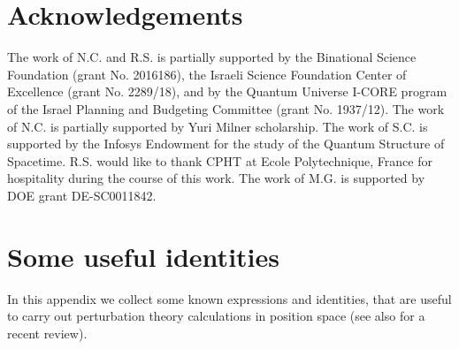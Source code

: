 \documentclass[aps,amsmath,amssymb,prd,showpacs,floatfix,preprint,superscriptaddress,nofootinbib,12pt]{article}
\begin{document}
\section*{Acknowledgements} \noindent  
The work of N.C. and R.S. is partially supported by the Binational Science Foundation (grant No. 2016186), the Israeli Science Foundation Center of Excellence (grant No. 2289/18), and by the Quantum Universe I-CORE program of the Israel Planning and Budgeting Committee (grant No. 1937/12). The work of N.C. is partially supported by Yuri Milner scholarship.
The work of S.C. is supported by the Infosys Endowment for the study of the Quantum Structure of Spacetime. 
R.S. would like to thank CPHT at Ecole Polytechnique, France for hospitality during the course of this work.
The work of M.G. is supported by DOE grant DE-SC0011842.

\appendix

\section{Some useful identities}
\label{app_a}

In this appendix we collect some known expressions and identities, that are useful
to carry out perturbation theory calculations in position space \cite{DEramo:1971hnd,Symanzik:1972wj,Gracey:1990wi}
(see also \cite{Preti:2018vog} for a recent review).
\end{document}
